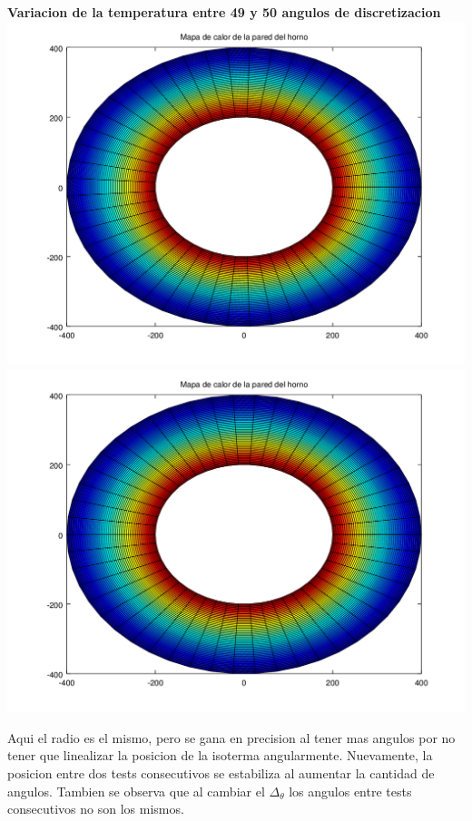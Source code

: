 \begin{enumerate}
		\textbf{Variacion de la temperatura entre 49 y 50 angulos de discretizacion}\\
	  	\includegraphics[scale=0.35]{experimentos1a_1b/evolucion_posicion_isoterma_temperatura/variacion_angulos_radio_fijo_se_suaviza_isoterma/test10_050_radios_049_angulos_inst_001_heatmap.png}
		\includegraphics[scale=0.35]{experimentos1a_1b/evolucion_posicion_isoterma_temperatura/variacion_angulos_radio_fijo_se_suaviza_isoterma/test10_050_radios_050_angulos_inst_001_heatmap.png}

\vspace{0.5cm}

Aqui el radio es el mismo, pero se gana en precision al tener mas angulos por no tener que linealizar la posicion de la isoterma angularmente. Nuevamente, la posicion entre dos tests consecutivos se estabiliza al aumentar la cantidad de angulos. Tambien se observa que al cambiar el $\Delta_\theta$ los angulos entre tests consecutivos no son los mismos.


\end{enumerate}
